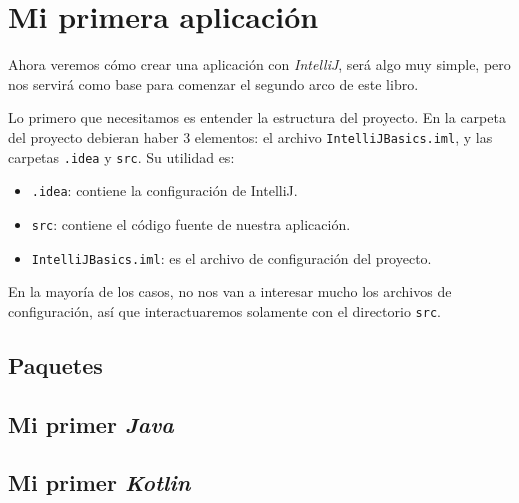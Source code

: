 \section{Mi primera aplicación}
  Ahora veremos cómo crear una aplicación con \textit{IntelliJ}, será algo muy simple, pero nos
  servirá como base para comenzar el segundo arco de este libro.

  Lo primero que necesitamos es entender la estructura del proyecto.
  En la carpeta del proyecto debieran haber 3 elementos: el archivo \texttt{IntelliJBasics.iml}, y 
  las carpetas \texttt{.idea} y \texttt{src}.
  Su utilidad es:
  \begin{itemize}
    \item \texttt{.idea}: contiene la configuración de IntelliJ.
    \item \texttt{src}: contiene el código fuente de nuestra aplicación.
    \item \texttt{IntelliJBasics.iml}: es el archivo de configuración del proyecto.
  \end{itemize}

  En la mayoría de los casos, no nos van a interesar mucho los archivos de configuración, así que
  interactuaremos solamente con el directorio \texttt{src}.

  \subsection{Paquetes}
  \subsection{Mi primer \textit{Java}}
  \subsection{Mi primer \textit{Kotlin}}
